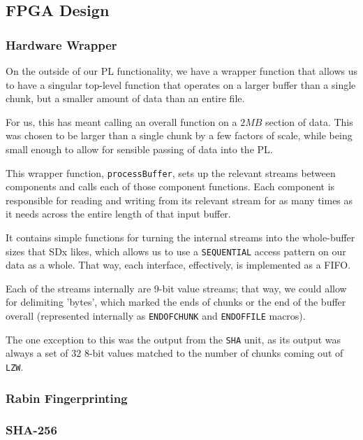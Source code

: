 \documentclass{article}
\begin{document}
\subsection{FPGA Design}


\subsubsection{Hardware Wrapper}

On the outside of our PL functionality, we have a wrapper function that allows us to have a singular top-level function that operates on a larger buffer than a single chunk, but a smaller amount of data than an entire file.
\par
For us, this has meant calling an overall function on a $2{MB}$ section of data. This was chosen to be larger than a single chunk by a few factors of scale, while being small enough to allow for sensible passing of data into the PL.
\newline\par
This wrapper function, \texttt{processBuffer}, sets up the relevant streams between components and calls each of those component functions. 
Each component is responsible for reading and writing from its relevant stream for as many times as it needs across the entire length of that input buffer.
\par
It contains simple functions for turning the internal streams into the whole-buffer sizes that SDx likes, which allows us to use a \texttt{SEQUENTIAL} access pattern on our data as a whole. That way, each interface, effectively, is implemented as a FIFO.
\newline\par
Each of the streams internally are $9$-bit value streams; that way, we could allow for delimiting 'bytes', which marked the ends of chunks or the end of the buffer overall (represented internally as \texttt{ENDOFCHUNK} and \texttt{ENDOFFILE} macros).
\par
The one exception to this was the output from the \texttt{SHA} unit, as its output was always a set of $32$ 8-bit values matched to the number of chunks coming out of \texttt{LZW}.

\subsubsection{Rabin Fingerprinting}

\subsubsection{SHA-256}
\end{document}
